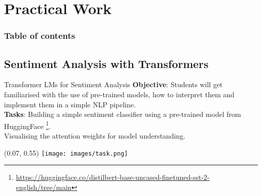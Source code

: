 \documentclass[UKenglish]{beamer}
\begin{document}
\section{Practical Work}
\begin{frame}
    \frametitle{Table of contents}
    \tableofcontents[currentsection]
\end{frame}
\subsection{Sentiment Analysis with Transformers}
\begin{frame}{Transformer LMs for Sentiment Analysis}
    \textbf{Objective}: Students will get familiarised with the use of pre-trained models, how to interpret them and implement them in a simple NLP pipeline. \\
    \textbf{Tasks}: Building a simple sentiment classifier using a pre-trained model from HuggingFace \footnote{\url{https://huggingface.co/distilbert-base-uncased-finetuned-sst-2-english/tree/main}}. \\
    Visualising the attention weights for model understanding.\\
\begin{textblock}{0.15}(0.07, 0.55)
        \texttt{[image: images/task.png]}
\end{textblock}
\end{frame}

\end{document}

